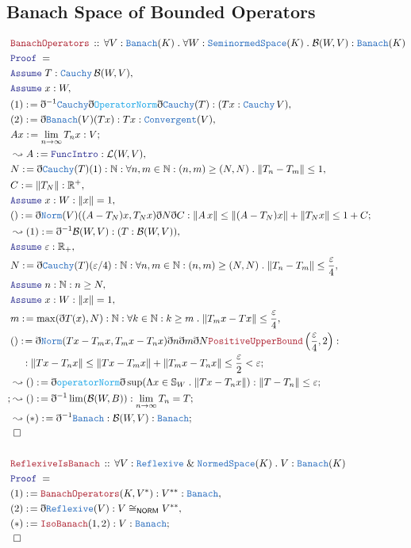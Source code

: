 \documentclass[12pt]{scrartcl}
\newcommand{\TYPE}[1]{\textcolor{NavyBlue}{\mathtt{#1}}}
\newcommand{\FUNC}[1]{\textcolor{Cerulean}{\mathtt{#1}}}
\newcommand{\LOGIC}[1]{\textcolor{Blue}{\mathtt{#1}}}
\newcommand{\THM}[1]{\textcolor{Maroon}{\mathtt{#1}}}
\renewcommand{\.}{\; . \;}
\newcommand{\de}{: \kern 0.1pc =}
\newcommand{\Theorem}[2]{& \THM{#1} \, :: \, #2 \\ & \Proof = \\ }
\newcommand{\NewLine}{\\ & \kern 1pc}
\newcommand{\Page}[1]{\begin{align*} #1 \end{align*} \newpage   }
\newcommand{ \bd }{ \ByDef }
\renewcommand{\And}{\; \& \;}
\newcommand{\Reals}{\mathbb{R} }
\newcommand{\Nat}{\mathbb{N} }
\newcommand{\Say}[3]{& #1 \de #2 : #3, \\}
\newcommand{\Conclude}[3]{& #1 \de #2 : #3; \\}
\newcommand{\Derive}[3]{& \leadsto #1 \de #2 : #3, \\}
\newcommand{\DeriveConclude}[3]{& \leadsto #1 \de #2 : #3 ; \\}
\newcommand{\A}{\LOGIC{Assume} \;}
\newcommand{\Assume}[2]{& \A #1 : #2, \\}
\newcommand{\QED}{\; \square}
\newcommand{\EndProof}{& \QED \\}
\newcommand{\ByDef}{\eth}
\newcommand{\Proof}{\LOGIC{Proof} \; }
\renewcommand{\L}{\mathcal{L}}
\newcommand{\NS}{\TYPE{NormedSpace}}
\newcommand{\SNS}{\TYPE{SeminormedSpace}}
\newcommand{\Banach}{\TYPE{Banach}}
\newcommand{\NORM}{\textsf{NORM}}
\newcommand{\B}{\mathcal{B}}
\begin{document}
\subsection{Banach Space of Bounded Operators}
\Page{
  \Theorem{BanachOperators}{ \forall V : \Banach(K) \. \forall W : \SNS(K) \. \B(W,V) : \Banach(K)}\
  \Assume{T}{\TYPE{Cauchy}\, \B(W,V)}
  \Assume{x}{W}
  \Say{(1)}{\bd^{-1} \TYPE{Cauchy} \bd \FUNC{OperatorNorm} \bd \TYPE{Cauchy}(T)}{(Tx : \TYPE{Cauchy} \, V)}
  \Say{(2)}{\bd \Banach (V)(Tx)}{Tx : \TYPE{Convergent}(V)}
  \Conclude{Ax}{\lim_{n \to \infty} T_n x}{V}
  \Derive{A}{\LOGIC{FuncIntro}}{\L(W,V)}  
  \Say{N}{\bd \TYPE{Cauchy}(T)(1)}{\Nat : \forall n,m \in \Nat : (n,m) \ge (N,N) \. \| T_n - T_m  \| \le 1 }
  \Say{C}{\| T_N \|}{\Reals^+}
  \Assume{x}{W : \| x \| = 1}
  \Conclude{()}{\bd \TYPE{Norm}(V)((A - T_N)x,T_N x) \bd N \bd C}{ \| A \, x \| \le  \| (A - T_N) x  \| + \| T_N x  \| \le 1  + C  
        }
  \Derive{(1)}{\bd^{-1} \B(W,V)}{(T : \B(W,V))}
   \Assume{\varepsilon}{\Reals_+}
   \Say{N}{\bd \TYPE{Cauchy}(T)(
   \varepsilon / 4)}{\Nat : \forall n,m \in \Nat : (n,m) \ge (N,N) \. \| T_n - T_m  \| \le \frac{\varepsilon}{4} }
   \Assume{n}{\Nat : n \ge N}
   \Assume{x}{W : \| x \| = 1}
   \Say{m}{\max(\bd T(x), N)}{ \Nat : \forall k \in \Nat : k \ge m \. \| T_m x - T x \| \le \frac{\varepsilon}{4}}
   \Conclude{()}{
   \bd \TYPE{Norm}(T x - T_m x, T_m x - T_n x)   
   \bd n \bd m \bd N  \THM{PositiveUpperBound}\left(\frac{\varepsilon}{4},2 \right)}
   { \NewLine : \|Tx - T_n x \|
    \le  \| Tx - T_m x \|  + \| T_m x - T_n x \|   
    \le \frac{\varepsilon}{2} < {\varepsilon}   }
  \DeriveConclude { ()}{ 
  \bd \FUNC{operatorNorm}  
  \bd \sup ( \Lambda x \in \mathbb{S}_W \. \| Tx - T_n x \|)}{\| T -  T_n\| \le \varepsilon};
  \DeriveConclude{()}{\bd^{-1} \lim (\B(W,B))}{\lim_{n \to \infty} T_n = T}
  \DeriveConclude{(*)}{\bd^{-1} \Banach}{\B(W,V) : \Banach}
  \EndProof
  \\
  \Theorem{ReflexiveIsBanach}{\forall V : \TYPE{Reflexive} \And \NS(K)   \.  V : \Banach (K) }
  \Say{(1)}{\THM{BanachOperators}(K,V^*)}{V^{**} : \Banach}
  \Say{(2)}{\bd \TYPE{Reflexive}(V)}{ V \cong_{\NORM} V^{**}}
  \Conclude{(*)}{ \THM{IsoBanach}(1,2)}{ V : \Banach}
  \EndProof
 }
\end{document}
